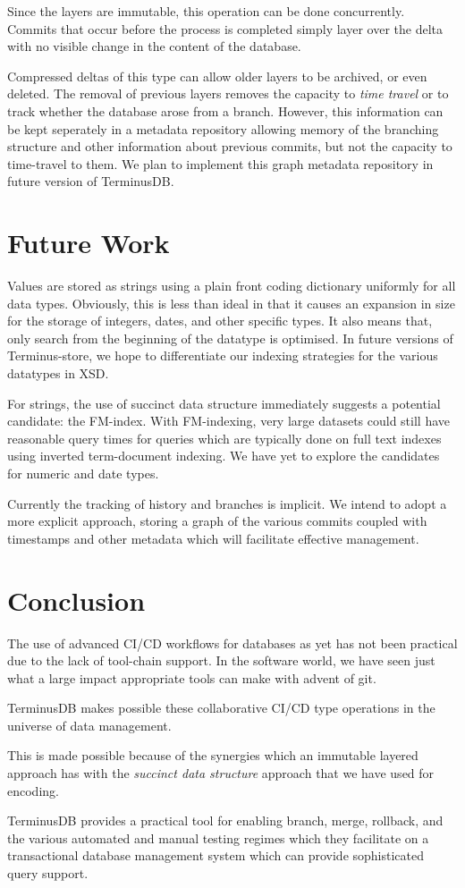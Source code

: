 \documentclass[10pt, a4paper, twocolumn]{article} %
\begin{document}
Since the layers are immutable, this operation can be done
concurrently. Commits that occur before the process is completed simply
layer over the delta with no visible change in the content of
the database.

Compressed deltas of this type can allow older layers to be archived,
or even deleted. The removal of previous layers removes the capacity
to {\em time travel} or to track whether the database arose from a
branch. However, this information can be kept seperately in a metadata
repository allowing memory of the branching structure and other
information about previous commits, but not the capacity to
time-travel to them. We plan to implement this graph metadata
repository in future version of TerminusDB.

\section{Future Work}

Values are stored as strings using a plain front coding dictionary
uniformly for all data types. Obviously, this is less than ideal in
that it causes an expansion in size for the storage of integers,
dates, and other specific types. It also means that, only search from
the beginning of the datatype is optimised. In future versions of
Terminus-store, we hope to differentiate our indexing strategies for
the various datatypes in XSD.

For strings, the use of succinct data structure immediately suggests a
potential candidate: the
FM-index\cite{Ferragina:2005:ICT:1082036.1082039}. With FM-indexing,
very large datasets could still have reasonable query times for
queries which are typically done on full text indexes using inverted
term-document indexing. We have yet to explore the candidates for
numeric and date types.

Currently the tracking of history and branches is implicit. We intend
to adopt a more explicit approach, storing a graph of the various
commits coupled with timestamps and other metadata which will
facilitate effective management.

\section{Conclusion}

The use of advanced CI/CD workflows for databases as yet has not been
practical due to the lack of tool-chain support. In the software world,
we have seen just what a large impact appropriate tools can make with
advent of git.

TerminusDB makes possible these collaborative CI/CD type operations in
the universe of data management.

This is made possible because of the synergies which an immutable
layered approach has with the {\em succinct data structure} approach
that we have used for encoding.

TerminusDB provides a practical tool for enabling branch, merge,
rollback, and the various automated and manual testing regimes which
they facilitate on a transactional database management system which
can provide sophisticated query support.

\printbibliography[title={Bibliography}]
\end{document}
